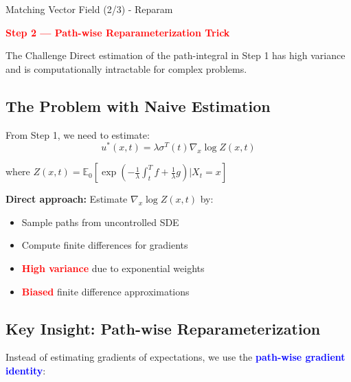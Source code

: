 \documentclass[aspectratio=169,xcolor=dvipsnames]{beamer}
\begin{document}
\begin{frame}[allowframebreaks]{Matching Vector Field (2/3) - Reparam}

    \begin{center}
        \Large\textcolor{red}{\textbf{Step 2 — Path-wise Reparameterization Trick}}
    \end{center}
    
    \vspace{0.3cm}
    
    \begin{block}{The Challenge}
        Direct estimation of the path-integral in Step 1 has high variance and is computationally intractable for complex problems.
    \end{block}
    
    \vspace{0.5cm}
    
    \subsection*{The Problem with Naive Estimation}
    
    From Step 1, we need to estimate:
    $$u^*(x,t) = \lambda \sigma^T(t) \nabla_x \log Z(x,t)$$
    
    where $Z(x,t) = \mathbb{E}_0[\exp(-\frac{1}{\lambda}\int_t^T f + \frac{1}{\lambda}g) | X_t = x]$
    
    \textbf{Direct approach:} Estimate $\nabla_x \log Z(x,t)$ by:
    \begin{itemize}
        \item Sample paths from uncontrolled SDE
        \item Compute finite differences for gradients
        \item \textcolor{red}{\textbf{High variance}} due to exponential weights
        \item \textcolor{red}{\textbf{Biased}} finite difference approximations
    \end{itemize}
    
    \vspace{0.8cm}
    
    \subsection*{Key Insight: Path-wise Reparameterization}
    
    Instead of estimating gradients of expectations, we use the \textcolor{blue}{\textbf{path-wise gradient identity}}:
    

\end{frame}
\end{document}

